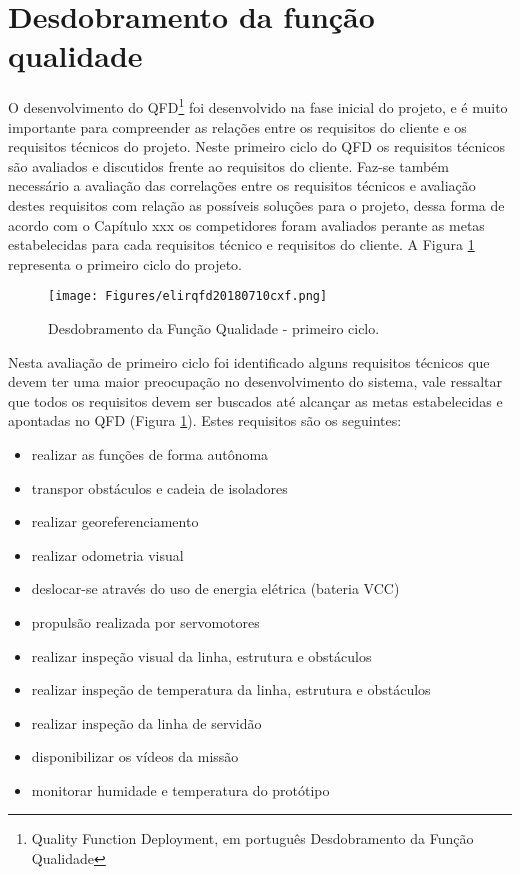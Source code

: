 %
\section{Desdobramento da função qualidade}
\label{sec:qfd}
O desenvolvimento do QFD\footnote{Quality Function Deployment, em português Desdobramento da Função Qualidade} foi desenvolvido na fase inicial do projeto, e é muito importante para compreender as relações entre os requisitos do cliente e os requisitos técnicos do projeto.
Neste primeiro ciclo do QFD os requisitos técnicos são avaliados e discutidos frente ao requisitos do cliente. Faz-se também necessário a avaliação das correlações entre os requisitos técnicos e avaliação destes requisitos com relação as possíveis soluções para o projeto, dessa forma de acordo com o Capítulo xxx os competidores foram avaliados perante as metas estabelecidas para cada requisitos técnico e requisitos do cliente.
A Figura \ref{fig_qfd1} representa o primeiro ciclo do projeto.

\begin{figure}[h]
	\centering
	\texttt{[image: Figures/elirqfd20180710cxf.png]}
	\caption{Desdobramento da Função Qualidade - primeiro ciclo.}
	\label{fig_qfd1}
\end{figure}

Nesta avaliação de primeiro ciclo foi identificado alguns requisitos técnicos que devem ter uma maior preocupação no desenvolvimento do sistema, vale ressaltar que todos os requisitos devem ser buscados até alcançar as metas estabelecidas e apontadas no QFD (Figura \ref{fig_qfd1}).
Estes requisitos são os seguintes:
\begin{itemize}
	\item realizar as funções de forma autônoma	
	\item transpor obstáculos e cadeia de isoladores	
	\item realizar georeferenciamento	
	\item realizar odometria visual	
	\item deslocar-se através do  uso de energia elétrica (bateria VCC)	
	\item propulsão realizada por servomotores	
	\item realizar inspeção visual da linha, estrutura e obstáculos	
	\item realizar inspeção de temperatura da linha, estrutura e obstáculos	
	\item realizar inspeção da linha de servidão	
	\item disponibilizar os vídeos da missão	
	\item monitorar humidade e temperatura do protótipo	
\end{itemize}

